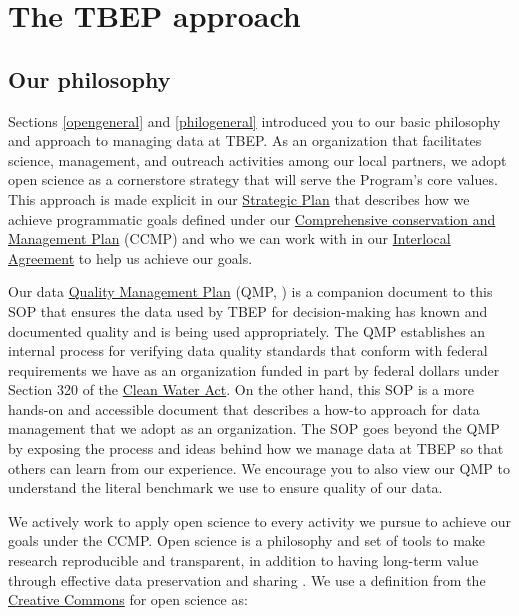\documentclass[
]{book}
\begin{document}
\hypertarget{tbepapproach}{%
\section{The TBEP approach}\label{tbepapproach}}

\hypertarget{philo}{%
\subsection{Our philosophy}\label{philo}}

Sections \ref{opengeneral} and \ref{philogeneral} introduced you to our basic philosophy and approach to managing data at TBEP. As an organization that facilitates science, management, and outreach activities among our local partners, we adopt open science as a cornerstore strategy that will serve the Program's core values. This approach is made explicit in our \href{https://drive.google.com/file/d/11xohuoaHDxNHRqgXoOHdI37FpWvac_rn/view?usp=sharing}{Strategic Plan} that describes how we achieve programmatic goals defined under our \href{https://indd.adobe.com/view/cf7b3c48-d2b2-4713-921c-c2a0d4466632}{Comprehensive conservation and Management Plan} (CCMP) and who we can work with in our \href{https://drive.google.com/file/d/1iJcWxmc5SeyDTqiCQ3MLQGWEY_EDGtZT/view?usp=sharing}{Interlocal Agreement} to help us achieve our goals.

Our data \href{https://drive.google.com/file/d/1DyA0PNHV8rEXGMwGiyS7sXY1ECLYpJJO/view}{Quality Management Plan} (QMP, \citet{tbep1620}) is a companion document to this SOP that ensures the data used by TBEP for decision-making has known and documented quality and is being used appropriately. The QMP establishes an internal process for verifying data quality standards that conform with federal requirements we have as an organization funded in part by federal dollars under Section 320 of the \href{https://www.epa.gov/laws-regulations/summary-clean-water-act}{Clean Water Act}. On the other hand, this SOP is a more hands-on and accessible document that describes a how-to approach for data management that we adopt as an organization. The SOP goes beyond the QMP by exposing the process and ideas behind how we manage data at TBEP so that others can learn from our experience. We encourage you to also view our QMP to understand the literal benchmark we use to ensure quality of our data.

We actively work to apply open science to every activity we pursue to achieve our goals under the CCMP. Open science is a philosophy and set of tools to make research reproducible and transparent, in addition to having long-term value through effective data preservation and sharing \citep{Beck20}. We use a definition from the \href{https://creativecommons.org/about/program-areas/open-science/}{Creative Commons} for open science as:
\end{document}
